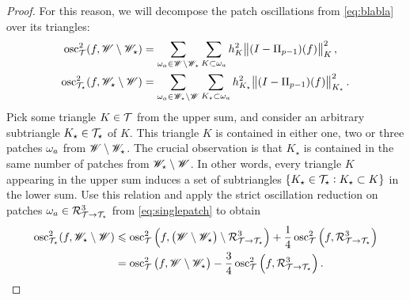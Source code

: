 \documentclass[thesis.tex]{subfiles}
\begin{document}
\begin{proof}
  For this reason, we will decompose the patch oscillations from \eqref{eq:blabla} over its triangles:
  \begin{align*}
    \operatorname{osc}_{\mathcal{T}}^2(f, \mathscr{W} \setminus \mathscr{W}_\star)  &= \sum_{\omega_a \in \mathscr{W} \setminus \mathscr{W}_\star} \sum_{K \subset \omega_a} h_{K}^2 \norm{(I-\Pi_{p-1})(f)}^2_{K}, \\
    \operatorname{osc}_{\mathcal{T}_\star}^2(f, \mathscr{W}_\star \setminus \mathscr{W})  &= \sum_{\omega_a \in \mathscr{W}_\star \setminus \mathscr{W}} \sum_{K_\star \subset \omega_a} h_{K_\star}^2 \norm{(I-\Pi_{p-1})(f)}^2_{K_\star}.
  \end{align*}
  Pick some triangle $K \in \mathcal{T}$ from the upper sum, and consider an arbitrary subtriangle $K_\star \in \mathcal{T}_\star$ of $K$.
  This triangle $K$ is contained in either one, two or three patches $\omega_a$ from $\mathscr{W} \setminus \mathscr{W}_\star$. The
  crucial observation is that $K_\star$ is contained in the same number of patches from $\mathscr{W}_\star \setminus \mathscr{W}$.
  In other words, every triangle $K$ appearing in the
  upper sum induces a set of subtriangles $\set{K_\star \in \mathcal{T}_\star : K_\star \subset K}$ in the lower sum.
  Use this relation and apply the strict oscillation reduction on patches $\omega_a \in \mathcal{R}^3_{\mathcal{T} \to \mathcal{T}_\star}$ from \eqref{eq:singlepatch}
  to obtain
  \begin{align*}
    \operatorname{osc}^2_{\mathcal{T}_\star}(f, \mathscr{W}_\star \setminus \mathscr{W}) &\leqslant \operatorname{osc}^2_{\mathcal{T}}\left(f, \left(\mathscr{W} \setminus \mathscr{W}_\star\right)\setminus \mathcal{R}^3_{\mathcal{T} \to \mathcal{T}_\star}\right) + \frac{1}{4} \operatorname{osc}^2_{\mathcal{T}}\left(f, \mathcal{R}^3_{\mathcal{T} \to \mathcal{T}_\star}\right)\\
    &= \operatorname{osc}_{\mathcal{T}}^2\left(f, \mathscr{W} \setminus \mathscr{W}_\star\right) - \frac{3}{4} \operatorname{osc}^2_{\mathcal{T}}\left(f, \mathcal{R}^3_{\mathcal{T} \to \mathcal{T}_\star}\right).\qedhere
  \end{align*}
\end{proof}
\end{document}
